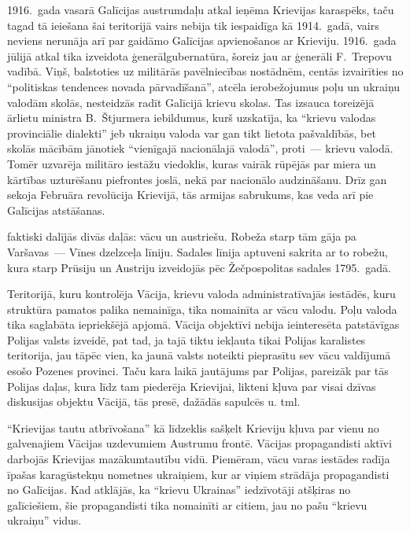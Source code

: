 \documentclass[twoside,a5paper,12pt,fleqn,openany]{extbook}
\begin{document}
1916.~gada vasarā Galīcijas austrumdaļu atkal ieņēma Krievijas karaspēks, taču tagad tā ieiešana šai teritorijā vairs nebija tik iespaidīga kā 1914.~gadā, vairs neviens nerunāja arī par gaidāmo Galīcijas apvienošanos ar Krieviju. 1916.~gada jūlijā atkal tika izveidota ģenerālgubernatūra, šoreiz jau ar ģenerāli F.~Trepovu vadībā. Viņš, balstoties uz militārās pavēlniecības nostādnēm, centās izvairīties no ``politiskas tendences novada pārvadīšanā'', atcēla ierobežojumus poļu un ukraiņu valodām skolās, nesteidzās radīt Galīcijā krievu skolas. Tas izsauca toreizējā ārlietu ministra B.~Štjurmera iebildumus, kurš uzskatīja, ka ``krievu valodas provinciālie dialekti'' jeb ukraiņu valoda var gan tikt lietota pašvaldībās, bet skolās mācībām jānotiek ``vienīgajā nacionālajā valodā'', proti~--- krievu valodā. Tomēr uzvarēja militāro iestāžu viedoklis, kuras vairāk rūpējās par miera un kārtības uzturēšanu piefrontes joslā, nekā par nacionālo audzināšanu. Drīz gan sekoja Februāra revolūcija Krievijā, tās armijas sabrukums, kas veda arī pie Galīcijas atstāšanas.

 faktiski dalījās divās daļās: vācu un austriešu. Robeža starp tām gāja pa Varšavas~--- Vīnes dzelzceļa līniju. Sadales līnija aptuveni sakrita ar to robežu, kura starp Prūsiju un Austriju izveidojās pēc Žečpospolitas sadales 1795.~gadā.

Teritorijā, kuru kontrolēja Vācija, krievu valoda administratīvajās iestādēs, kuru struktūra pamatos palika nemainīga, tika nomainīta ar vācu valodu. Poļu valoda tika saglabāta iepriekšējā apjomā. Vācija objektīvi nebija ieinteresēta patstāvīgas Polijas valsts izveidē, pat tad, ja tajā tiktu iekļauta tikai Polijas karalistes teritorija, jau tāpēc vien, ka jaunā valsts noteikti pieprasītu sev vācu valdījumā esošo Pozenes provinci. Taču kara laikā jautājums par Polijas, pareizāk par tās Polijas daļas, kura līdz tam piederēja Krievijai, likteni kļuva par visai dzīvas diskusijas objektu Vācijā, tās presē, dažādās sapulcēs u. tml.

``Krievijas tautu atbrīvošana'' kā līdzeklis sašķelt Krieviju kļuva par vienu no galvenajiem Vācijas uzdevumiem Austrumu frontē. Vācijas propagandisti aktīvi darbojās Krievijas mazākumtautību vidū. Piemēram, vācu varas iestādes radīja īpašas karagūstekņu nometnes ukraiņiem, kur ar viņiem strādāja propagandisti no Galīcijas. Kad atklājās, ka ``krievu Ukrainas'' iedzīvotāji atšķiras no galīciešiem, šie propagandisti tika nomainīti ar citiem, jau no pašu ``krievu ukraiņu'' vidus.
\end{document}
